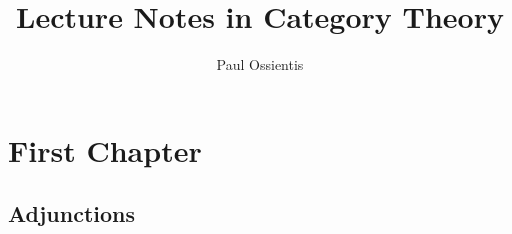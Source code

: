 \documentclass{report}
\title{Lecture Notes in Category Theory}
\author{Paul Ossientis}
\begin{document}
\maketitle
\tableofcontents
\newpage
\chapter{First Chapter}
    \section{Adjunctions}
        

\printindex

\end{document}
